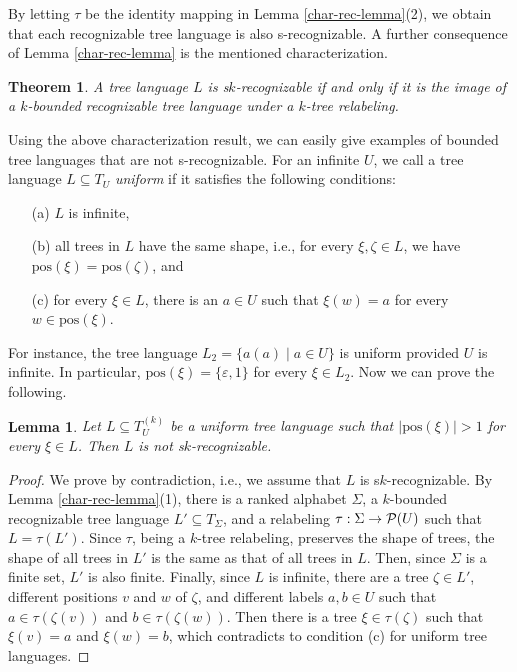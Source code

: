 \documentclass[10pt]{scrartcl}
\newtheorem{lm}[df]{Lemma}
\newtheorem{theo}[df]{Theorem}
\newcommand{\pos}{\mathrm{pos}}
\newcommand{\PS}{{\cal P}}
\def\ui#1{^{(#1)}}
\begin{document}
By letting $\tau$  be the identity mapping in Lemma \ref{char-rec-lemma}(2), we obtain that each recognizable tree language is also s-recognizable.
A further consequence of Lemma \ref{char-rec-lemma} is the mentioned  characterization. 
\begin{theo}\label{th:char}
A tree language $L$ is
  s$k$-recognizable if and only if it is the image of a $k$-bounded recognizable
  tree language under a $k$-tree relabeling.
\end{theo}

Using the above characterization result, we can easily give examples of bounded tree languages that are not s-recognizable. For an infinite $U$, we call a tree language $L\subseteq T_U$ {\em uniform} if it satisfies the following conditions:
\begin{enumerate}
\item[(a)] $L$ is infinite,
\item[(b)] all trees in $L$ have the same shape, i.e., for every $\xi,\zeta \in L$, we have $\pos(\xi)=\pos(\zeta)$, and
\item[(c)] for every $\xi \in L$, there is an $a\in U$ such that $\xi(w)=a$ for every $w\in \pos(\xi)$.
\end{enumerate}
For instance, the tree language $L_2=\{a(a)\mid a\in U\}$ is uniform provided $U$ is infinite.
In particular, $\pos(\xi)=\{\varepsilon,1\}$ for every $\xi\in L_2$.
Now we can prove the following.


\begin{lm}\rm \label{non-rec-lemma} Let $L\subseteq T_U\ui k$ be a uniform tree language such that $|\pos(\xi)| > 1$ for every $\xi \in L$.
Then $L$ is not s$k$-recognizable.
\end{lm}
\begin{proof} We prove by contradiction, i.e., we assume that $L$ is s$k$-recognizable. By Lemma \ref{char-rec-lemma}(1), there is a ranked alphabet $\Sigma$,
a $k$-bounded recognizable tree language $L'\subseteq T_\Sigma$, and a  relabeling $\tau: \Sigma \to \PS(U)$ such that $L=\tau(L')$. Since $\tau$, being a $k$-tree relabeling,
preserves the shape of trees, the shape of all trees in $L'$ is the same as that of all trees in $L$. Then,  since $\Sigma$ is a finite set, $L'$ is also finite.
Finally, since $L$ is infinite, there are a tree $\zeta \in L'$,
different positions $v$ and $w$ of $\zeta$, and different labels $a, b \in U$ such that $a \in \tau(\zeta(v))$ and $b \in \tau(\zeta(w))$. Then there is a tree $\xi \in \tau(\zeta)$ such that $\xi(v)=a$ and $\xi(w)=b$, which contradicts to condition (c) for uniform tree languages.
\end{proof}
\end{document}

